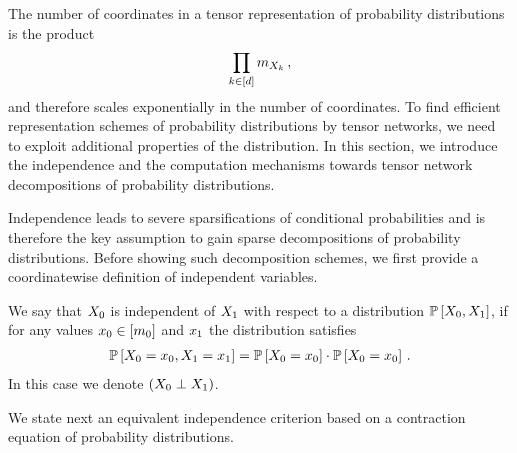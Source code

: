 
The number of coordinates in a tensor representation of probability distributions is the product
\begin{align*}
    \prod_{k\in[d]}m_{X_{k}} \, ,
\end{align*}
and therefore scales exponentially in the number of coordinates.
To find efficient representation schemes of probability distributions by tensor networks, we need to exploit additional properties of the distribution.
In this section, we introduce the independence and the computation mechanisms towards tensor network decompositions of probability distributions.

\subsect{\IndependenceMechanism{}}

Independence leads to severe sparsifications of conditional probabilities and is therefore the key assumption to gain sparse decompositions of probability distributions.
Before showing such decomposition schemes, we first provide a coordinatewise definition of independent variables.

\begin{definition}[Independence]
    \label{def:independence}
    We say that $X_{0}$ is independent of $X_{1}$ with respect to a distribution $\mathbb{P}\left[X_{0},X_{1}\right]$, if for any values $x_{0}\in[m_{0}]$ and $x_{1}$ the distribution satisfies
    \begin{align*}
        \mathbb{P}\left[X_{0}=x_{0},X_{1}=x_{1}\right]
        = \mathbb{P}\left[X_{0}=x_{0}\right]\cdot\mathbb{P}\left[X_{0}=x_{0}\right] \, .
    \end{align*}
    In this case we denote $\left(X_{0}\perp X_{1}\right)$.
\end{definition}

We state next an equivalent independence criterion based on a contraction equation of probability distributions.

